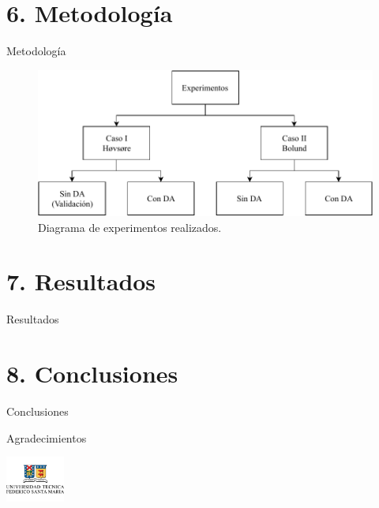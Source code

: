 \documentclass[mathserif]{beamer}
\begin{document}
\section{6. Metodología}
\begin{frame}{Metodología}
	\begin{figure}[h!]
		\centering
		\includegraphics[width=1\linewidth,clip]{tesis_experimentos}
		\caption{Diagrama de experimentos realizados.}
	\end{figure}
\end{frame}

\section{7. Resultados}
\begin{frame}{Resultados}
\end{frame}

\section{8. Conclusiones}
\begin{frame}{Conclusiones}
\end{frame}

\begin{frame}{Agradecimientos}
\end{frame}


\begin{frame}
	\vspace{0.3cm}
	\begin{center} \includegraphics[height=1.5cm]{utfsm_logo} \end{center}
	\vspace{-0.5cm}
	\titlepage
\end{frame}
\end{document}
